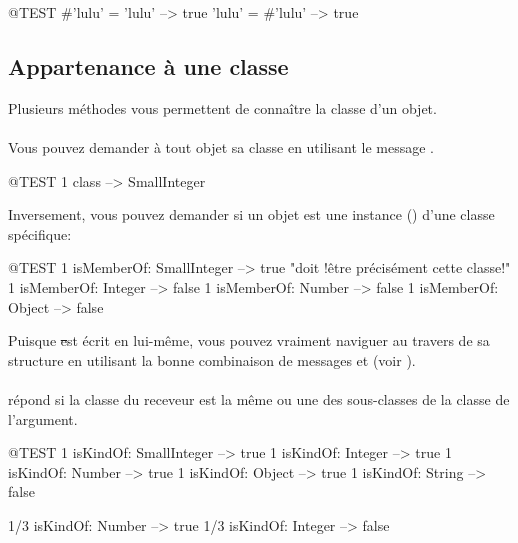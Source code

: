 \documentclass[a4paper,10pt,twoside]{book}
\begin{document}
\begin{code}{@TEST}
#'lulu' = 'lulu' --> true
'lulu' = #'lulu' --> true
\end{code}


\subsection{Appartenance \`a une classe}
Plusieurs m\'ethodes vous permettent de conna\^itre la classe d'un objet.

\paragraph{} Vous pouvez demander \`a tout objet sa classe en utilisant le message .
\begin{code}{@TEST}
1 class --> SmallInteger
\end{code}

Inversement, vous pouvez demander si un objet est une instance 
()
d'une classe sp\'ecifique:
\begin{code}{@TEST}
1 isMemberOf: SmallInteger --> true    "doit !\^etre pr\'ecis\'ement cette classe!"
1 isMemberOf: Integer      --> false
1 isMemberOf: Number       --> false
1 isMemberOf: Object       --> false
\end{code}

Puisque \st est \'ecrit en lui-m\^eme, vous pouvez vraiment naviguer au travers de sa structure en utilisant la bonne combinaison de messages  et  (voir ). 

\paragraph{}
 r\'epond  si la classe du receveur est la m\^eme ou une des sous-classes de la classe de l'argument.

\begin{code}{@TEST}
1 isKindOf: SmallInteger --> true
1 isKindOf: Integer          --> true
1 isKindOf: Number         --> true
1 isKindOf: Object           --> true
1 isKindOf: String            --> false

1/3 isKindOf: Number      --> true
1/3 isKindOf: Integer        --> false
\end{code}
\end{document}
